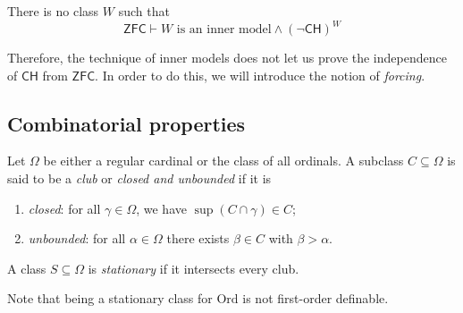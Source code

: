 \begin{lemma}[Shepherdson]
    There is no class \( W \) such that
    \[ \mathsf{ZFC} \vdash W \text{ is an inner model} \wedge (\neg\mathsf{CH})^W \]
\end{lemma}
Therefore, the technique of inner models does not let us prove the independence of \( \mathsf{CH} \) from \( \mathsf{ZFC} \).
In order to do this, we will introduce the notion of \emph{forcing}.

\subsection{Combinatorial properties}
\begin{definition}
    Let \( \Omega \) be either a regular cardinal or the class of all ordinals.
    A subclass \( C \subseteq \Omega \) is said to be a \emph{club} or \emph{closed and unbounded} if it is
    \begin{enumerate}
        \item \emph{closed}: for all \( \gamma \in \Omega \), we have \( \sup(C \cap \gamma) \in C \);
        \item \emph{unbounded}: for all \( \alpha \in \Omega \) there exists \( \beta \in C \) with \( \beta > \alpha \).
    \end{enumerate}
    A class \( S \subseteq \Omega \) is \emph{stationary} if it intersects every club.
\end{definition}
Note that being a stationary class for \( \mathrm{Ord} \) is not first-order definable.

